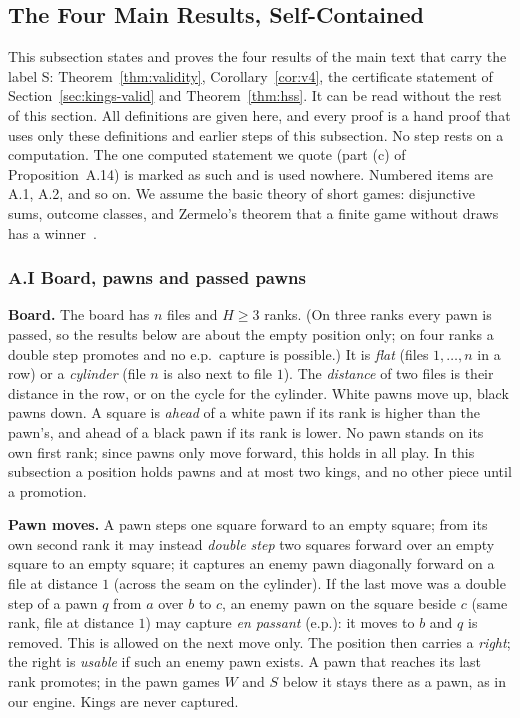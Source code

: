 \subsection*{The Four Main Results, Self-Contained}

This subsection states and proves the four results of the main text that carry the label S: Theorem~\ref{thm:validity},
Corollary~\ref{cor:v4}, the certificate statement of Section~\ref{sec:kings-valid} and Theorem~\ref{thm:hss}. It can be
read without the rest of this section. All definitions are given here, and every proof is a hand proof that uses only
these definitions and earlier steps of this subsection. No step rests on a computation. The one computed statement we
quote (part (c) of Proposition~A.14) is marked as such and is used nowhere. Numbered items are A.1, A.2, and so on.
We assume the basic theory of short games: disjunctive sums, outcome classes, and Zermelo's theorem that a finite game
without draws has a winner~\cite{Siegel2013}.

\subsubsection*{A.I Board, pawns and passed pawns}

\textbf{Board.} The board has $n$ files and $H\ge 3$ ranks. (On three ranks every pawn is passed, so the results below are about the empty position only; on four ranks a double step
promotes and no e.p.\ capture is possible.) It is \emph{flat} (files $1,\dots,n$ in a row) or a
\emph{cylinder} (file $n$ is also next to file $1$). The \emph{distance} of two files is their distance in the row, or
on the cycle for the cylinder. White pawns move up, black pawns down. A square is \emph{ahead} of a white pawn if its rank is higher than the pawn's, and ahead of a black pawn if
its rank is lower. No pawn stands on its own first rank; since pawns only move forward, this holds in all play. In this subsection a position holds pawns and at most two
kings, and no other piece until a promotion.

\textbf{Pawn moves.} A pawn steps one square forward to an empty square; from its own second rank it may instead
\emph{double step} two squares forward over an empty square to an empty square; it captures an enemy pawn diagonally
forward on a file at distance $1$ (across the seam on the cylinder). If the last move was a double step of a pawn $q$ from
$a$ over $b$ to $c$, an enemy pawn on the square beside $c$ (same rank, file at distance $1$) may capture \emph{en passant}
(e.p.): it moves to $b$ and $q$ is removed. This is allowed on the next move only. The position then carries a
\emph{right}; the right is \emph{usable} if such an enemy pawn exists. A pawn that reaches its last rank promotes; in the pawn games $W$ and $S$
below it stays there as a pawn, as in our engine. Kings are
never captured.

